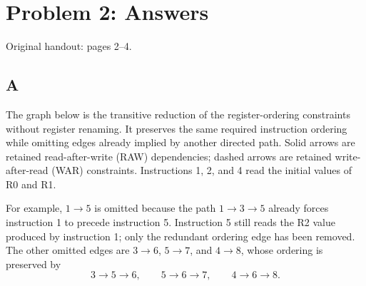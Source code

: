 \documentclass[letterpaper,12pt]{article}
\newcommand{\handout}[1]{%
  
}
\newenvironment{answer}{\par}{\par\medskip}
\begin{document}
\clearpage

\handout{2-4}
\section*{Problem 2: Answers}
\noindent Original handout: pages 2--4.\par

\subsection*{A}
\begin{answer}
The graph below is the transitive reduction of the register-ordering
constraints without register renaming. It preserves the same required
instruction ordering while omitting edges already implied by another
directed path. Solid arrows are retained read-after-write (RAW)
dependencies; dashed arrows are retained write-after-read (WAR) constraints.
Instructions 1, 2, and 4 read the initial values of R0 and R1.

\begin{center}
\end{center}

For example, $1\to5$ is omitted because the path $1\to3\to5$ already
forces instruction 1 to precede instruction 5. Instruction 5 still reads
the R2 value produced by instruction 1; only the redundant ordering edge
has been removed. The other omitted edges are $3\to6$, $5\to7$, and
$4\to8$, whose ordering is preserved by
\[
  3\to5\to6,\qquad 5\to6\to7,\qquad 4\to6\to8.
\]


\end{answer}
\end{document}
